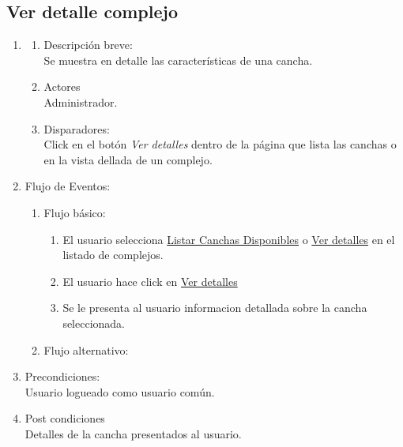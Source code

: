 \documentclass[a4paper,11pt]{article}
\begin{document}
\subsection{Ver detalle complejo}
\begin{enumerate}

    \item
    \begin{enumerate}
    \item Descripción breve: \\
        Se muestra en detalle las características de una cancha.
    \item Actores \\
        Administrador.
    \item Disparadores: \\
        Click en el botón \emph{Ver detalles} dentro de la
        página que lista las canchas o en la vista dellada de un complejo.
    \end{enumerate}

    \item Flujo de Eventos: 

    \begin{enumerate}

        \item Flujo básico:
        \begin{enumerate}
            \item El usuario selecciona \underline{Listar Canchas Disponibles}
                o \underline{Ver detalles} en el listado de complejos.
            \item El usuario hace click en \underline{Ver detalles}
            \item Se le presenta al usuario informacion detallada sobre la cancha seleccionada.
        \end{enumerate}
    \item Flujo alternativo:\\
    \end{enumerate}

    \item Precondiciones: \\
        Usuario logueado como usuario común.

    \item Post condiciones \\
        Detalles de la cancha presentados al usuario.

\end{enumerate}
\end{document}
